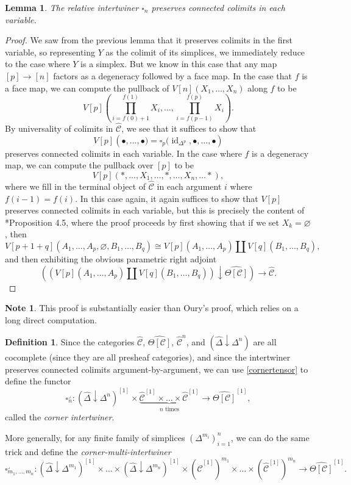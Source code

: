 \documentclass[a4paper]{article}
\numberwithin{equation}{subsection}
\theoremstyle{plain}   %
\newtheorem{lemma}[equation]{Lemma}
\theoremstyle{definition}
\newtheorem{defn}[equation]{Definition}
\newtheorem{note}[equation]{Note}
\theoremstyle{remark}
\theoremstyle{plain}
\DeclareMathOperator{\id}{id}
\newcommand{\overcat}[2]{{\left(#1\downarrow #2\right)}}
\newcommand{\psh}[1]{\ensuremath{\widehat{#1}}}
\providecommand{\C}{}
\renewcommand{\C}{\ensuremath{\mathcal{C}}}
\newcommand{\cellset}{\ensuremath{\widehat{\Theta[\mathcal{C}]}}}
\begin{document}
\begin{lemma}\label{conncolims}
	The relative intertwiner \(\square_n\) preserves connected colimits in each variable.  
\end{lemma}
\begin{proof}
	We saw from the previous lemma that it preserves colimits in the first variable, so representing \(Y\) as the colimit of its simplices, we immediately reduce to the case where \(Y\) is a simplex.  But we know in this case that any map \([p]\to [n]\) factors as a degeneracy followed by a face map.  In the case that \(f\) is a face map, we can compute the pullback of \(V[n](X_1,\dots,X_n)\) along \(f\) to be 
	\[V[p]\left(\prod_{i=f(0)+1}^{f(1)}X_i,\dots, \prod_{i=f(p-1)}^{f(p)}X_i\right).\]  By universality of colimits in \(\psh{\C}\), we see that it suffices to show that \[V[p]\left(\bullet,\dots,\bullet)=\square_p(\id_{\Delta^p},\bullet,\dots,\bullet\right)\] preserves connected colimits in each variable.  In the case where \(f\) is a degeneracy map, we can compute the pullback over \([p]\) to be \[V[p](\ast, \dots, X_1, \dots, \ast, \dots, X_n, \dots \ast),\] where we fill in the terminal object of \(\psh{\C}\) in each argument \(i\) where \(f(i-1)=f(i)\).  In this case again, it again suffices to show that \(V[p]\) preserves connected colimits in each variable, but this is precisely the content of \cite{rezk-theta-n-spaces}*{Proposition 4.5}, where the proof proceeds by first showing that if we set \(X_k=\varnothing\), then
	\[V[p+1+q](A_1,\dots, A_p, \varnothing, B_1,\dots ,B_q) \cong V[p](A_1,\dots,A_p) \coprod V[q](B_1,\dots,B_q),\]
	and then exhibiting the obvious parametric right adjoint
	\[\overcat{\left(V[p](A_1,\dots,A_p) \coprod V[q](B_1,\dots,B_q)\right)}{\psh{\Theta[\C]}}\to \psh{\C}.\]
\end{proof}
\begin{note} 
	This proof is substantially easier than Oury's proof, which relies on a long direct computation.
\end{note}

\begin{defn}
	Since the categories \(\psh{\C}\), \(\cellset\), \(\psh{\C}^n\), and \(\overcat{\psh{\Delta}}{\Delta^n}\) are all cocomplete (since they are all presheaf categories), and since the intertwiner preserves connected colimits argument-by-argument, we can use \ref{cornertensor} to define the functor
	\[\square^\lrcorner_n:\overcat{\psh{\Delta}}{\Delta^n}^{[1]} \times \underbrace{\psh{\C}^{[1]}\times \dots \times \psh{\C}^{[1]}}_{n\text{ times}} \to \cellset^{[1]},\] called the \emph{corner intertwiner}.

	More generally, for any finite family of simplices \(\left(\Delta^{m_i}\right)^n_{i=1}\), we can do the same trick and define the \emph{corner-multi-intertwiner}
	\[\square^\lrcorner_{m_1,\dots,m_n}: \overcat{\psh{\Delta}}{\Delta^{m_1}}^{[1]} \times \dots \times \overcat{\psh{\Delta}}{\Delta^{m_n}}^{[1]} \times \left(\psh{\C}^{[1]}\right)^{m_1} \times \dots \times \left(\psh{\C}^{[1]}\right)^{m_n} \to \cellset^{[1]}.\]
\end{defn}
\end{document}
